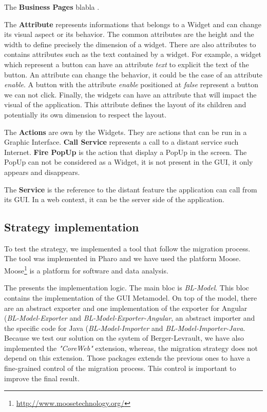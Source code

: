 \documentclass[conference]{IEEEtran}
\begin{document}
    The \textbf{Business Pages} blabla .

    The \textbf{Attribute} represents informations that belongs to a Widget and can change its visual aspect or its behavior.
    The common attributes are the height and the width to define precisely the dimension of a widget.
    There are also attributes to contains attributes such as the text contained by a widget. 
    For example, a widget which represent a button can have an attribute \textit{text} to 
        explicit the text of the button.
    An attribute can change the behavior, it could be the case of an attribute \textit{enable}.
    A button with the attribute \textit{enable} positioned at \textit{false} represent a button
        we can not click.
    Finally, the widgets can have an attribute that will impact the visual of the application.
    This attribute defines the layout of its children and potentially its own dimension to respect the layout. 

    The \textbf{Actions} are own by the Widgets.
    They are actions that can be run in a Graphic Interface.
    \textbf{Call Service} represents a call to a distant service such Internet.
    \textbf{Fire PopUp} is the action that display a PopUp in the screen.
    The PopUp can not be considered as a Widget, 
        it is not present in the GUI, 
        it only appears and disappears.

    The \textbf{Service} is the reference to the distant feature the application can call from its GUI.
    In a web context, it can be the server side of the application.
    
    
    \subsection{Strategy implementation}
    \label{sec:implementation}
    
    To test the strategy, we implemented a tool that follow the migration process.
    The tool was implemented in Pharo and we have used the platform Moose.
    Moose\footnote{\url{http://www.moosetechnology.org/}} is a platform for software and data analysis.

    The  presents the implementation logic.
    The main bloc is \textit{BL-Model}.
    This bloc contains the implementation of the GUI Metamodel.
    On top of the model, there are 
        an abstract exporter and one implementation of the exporter for Angular (\textit{BL-Model-Exporter} and \textit{BL-Model-Exporter-Angular},
        an abstract importer and the specific code for Java (\textit{BL-Model-Importer} and \textit{BL-Model-Importer-Java}.
    Because we test our solution on the system of Berger-Levrault,
        we have also implemented the \textit{"CoreWeb"} extension,
        whereas, the migration strategy does not depend on this extension.
    Those packages extends the previous ones to have a fine-grained control of the migration
        process.
    This control is important to improve the final result.
\end{document}
